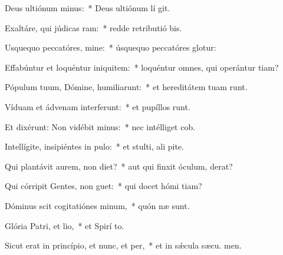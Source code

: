 \item Deus ultiónum minus:~* Deus ultiónum lí git.
\item Exaltáre, qui júdicas ram:~* redde retributió bis.
\item Usquequo peccatóres, mine:~* úsquequo peccatóres glotur:
\item Effabúntur et loquéntur iniquitem:~* loquéntur omnes, qui operántur tiam?
\item Pópulum tuum, Dómine, humiliarunt:~* et hereditátem tuam runt.
\item Víduam et ádvenam interferunt:~* et pupíllos runt.
\item Et dixérunt: Non vidébit minus:~* nec intélliget  cob.
\item Intellígite, insipiéntes in pulo:~* et stulti, ali pite.
\item Qui plantávit aurem, non diet?~* aut qui finxit óculum,  derat?
\item Qui córripit Gentes, non guet:~* qui docet hómi tiam?
\item Dóminus scit cogitatiónes minum,~* quón næ sunt.
\item Glória Patri, et lio,~* et Spirí to.
\item Sicut erat in princípio, et nunc, et per,~* et in sǽcula sæcu. men.
